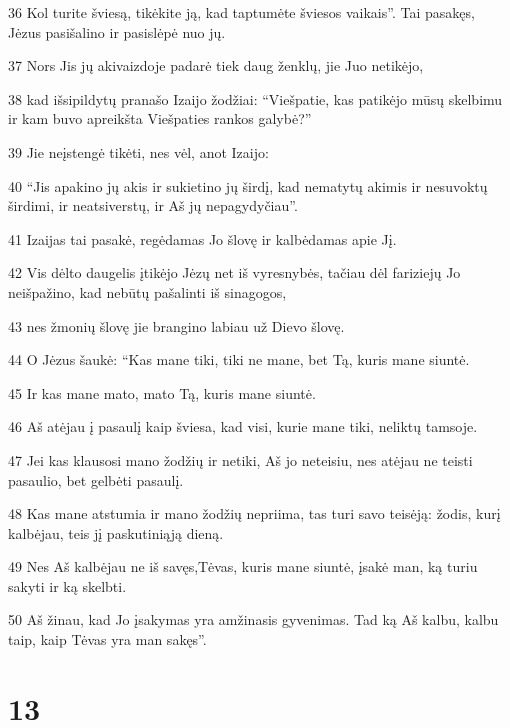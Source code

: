 \par 36 Kol turite šviesą, tikėkite ją, kad taptumėte šviesos vaikais”. Tai pasakęs, Jėzus pasišalino ir pasislėpė nuo jų. 
\par 37 Nors Jis jų akivaizdoje padarė tiek daug ženklų, jie Juo netikėjo,­ 
\par 38 kad išsipildytų pranašo Izaijo žodžiai: “Viešpatie, kas patikėjo mūsų skelbimu ir kam buvo apreikšta Viešpaties rankos galybė?” 
\par 39 Jie neįstengė tikėti, nes vėl, anot Izaijo: 
\par 40 “Jis apakino jų akis ir sukietino jų širdį, kad nematytų akimis ir nesuvoktų širdimi, ir neatsiverstų, ir Aš jų nepagydyčiau”. 
\par 41 Izaijas tai pasakė, regėdamas Jo šlovę ir kalbėdamas apie Jį. 
\par 42 Vis dėlto daugelis įtikėjo Jėzų net iš vyresnybės, tačiau dėl fariziejų Jo neišpažino, kad nebūtų pašalinti iš sinagogos, 
\par 43 nes žmonių šlovę jie brangino labiau už Dievo šlovę. 
\par 44 O Jėzus šaukė: “Kas mane tiki, tiki ne mane, bet Tą, kuris mane siuntė. 
\par 45 Ir kas mane mato, mato Tą, kuris mane siuntė. 
\par 46 Aš atėjau į pasaulį kaip šviesa, kad visi, kurie mane tiki, neliktų tamsoje. 
\par 47 Jei kas klausosi mano žodžių ir netiki, Aš jo neteisiu, nes atėjau ne teisti pasaulio, bet gelbėti pasaulį. 
\par 48 Kas mane atstumia ir mano žodžių nepriima, tas turi savo teisėją: žodis, kurį kalbėjau, teis jį paskutiniąją dieną. 
\par 49 Nes Aš kalbėjau ne iš savęs,­Tėvas, kuris mane siuntė, įsakė man, ką turiu sakyti ir ką skelbti. 
\par 50 Aš žinau, kad Jo įsakymas yra amžinasis gyvenimas. Tad ką Aš kalbu, kalbu taip, kaip Tėvas yra man sakęs”.


\chapter{13}


